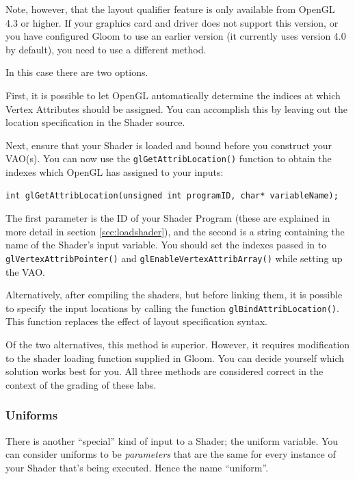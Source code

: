 Note, however, that the layout qualifier feature is only available from OpenGL 4.3 or higher. If your graphics card and driver does not support this version, or you have configured Gloom to use an earlier version (it currently uses version 4.0 by default), you need to use a different method.

In this case there are two options.

First, it is possible to let OpenGL automatically determine the indices at which Vertex Attributes should be assigned. You can accomplish this by leaving out the location specification in the Shader source.

Next, ensure that your Shader is loaded and bound before you construct your VAO(s). You can now use the \texttt{glGetAttribLocation()} function to obtain the indexes which OpenGL has assigned to your inputs:

\begin{verbatim}
int glGetAttribLocation(unsigned int programID, char* variableName);
\end{verbatim}

The first parameter is the ID of your Shader Program (these are explained in more detail in section \ref{sec:loadshader}), and the second is a string containing the name of the Shader's input variable. You should set the indexes passed in to \texttt{glVertexAttribPointer()} and \texttt{glEnableVertexAttribArray()} while setting up the VAO.

Alternatively, after compiling the shaders, but before linking them, it is possible to specify the input locations by calling the function \texttt{glBindAttribLocation()}. This function replaces the effect of layout specification syntax.

Of the two alternatives, this method is superior. However, it requires modification to the shader loading function supplied in Gloom. You can decide yourself which solution works best for you. All three methods are considered correct in the context of the grading of these labs.

\subsubsection{Uniforms}

There is another ``special'' kind of input to a Shader; the uniform variable. You can consider uniforms to be \emph{parameters} that are the same for every instance of your Shader that's being executed. Hence the name ``uniform''. 

